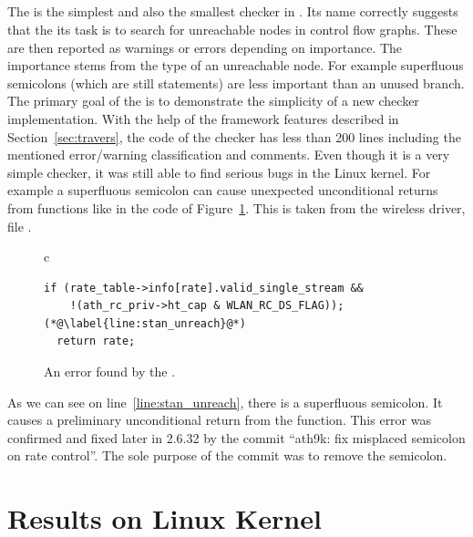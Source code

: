 \subsection{\RC}
The \RC is the simplest and also the smallest checker in \stan. Its name
correctly suggests that the its task is to search for unreachable nodes in
control flow graphs. These are then reported as warnings or errors depending
on importance. The importance stems from the type of an unreachable node. For
example superfluous semicolons (which are still statements) are less important
than an unused branch. The primary goal of the \RC is to demonstrate the
simplicity of a new checker implementation. With the help of the framework
features described in Section~\ref{sec:travers}, the code of the checker has
less than 200 lines including the mentioned error/warning classification and
comments.  Even though it is a very simple checker, it was still able to find
serious bugs in the Linux kernel. For example a superfluous semicolon can
cause unexpected unconditional returns from functions like in the code of
Figure~\ref{fig:stan_unreach}.  This is taken from the  wireless
driver, file .
\begin{figure}[htb]
\begin{center}
\begin{tabular}{c}
\begin{lstlisting}
if (rate_table->info[rate].valid_single_stream &&
    !(ath_rc_priv->ht_cap & WLAN_RC_DS_FLAG));(*@\label{line:stan_unreach}@*)
  return rate;
\end{lstlisting}
\end{tabular}
\end{center}
  \caption{An error found by the \RC.}
  \label{fig:stan_unreach}
\end{figure}
As we can see on line~\ref{line:stan_unreach}, there is a superfluous
semicolon. It causes a preliminary unconditional return from the function.
This error was confirmed and fixed later in 2.6.32 by the commit ``ath9k: fix
misplaced semicolon on rate control''. The sole purpose of the commit was to
remove the semicolon.


\section{Results on Linux Kernel}\label{sec:stan_results}

